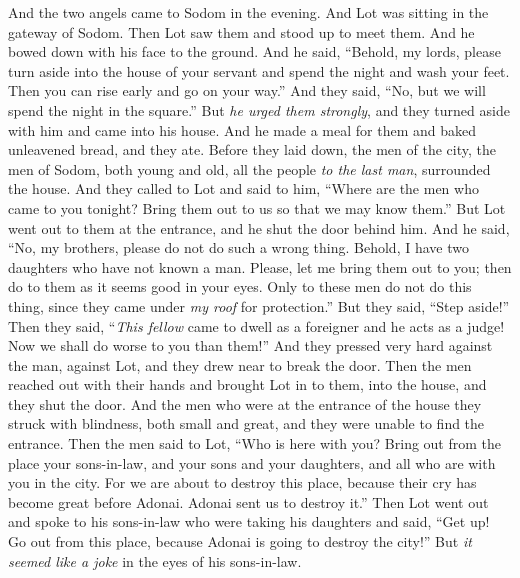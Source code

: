 \begin{biblechapter} %
 And the two angels came to Sodom in the evening. And Lot was sitting in the gateway of Sodom. Then Lot saw them and stood up to meet them. And he bowed down with his face to the ground.
\verse And he said, “Behold, my lords, please turn aside into the house of your servant and spend the night and wash your feet. Then you can rise early and go on your way.” And they said, “No, but we will spend the night in the square.”
\verse But \textit{he urged them strongly}, and they turned aside with him and came into his house. And he made a meal for them and baked unleavened bread, and they ate.
\verse Before they laid down, the men of the city, the men of Sodom, both young and old, all the people \textit{to the last man}, surrounded the house.
\verse And they called to Lot and said to him, “Where are the men who came to you tonight? Bring them out to us so that we may know them.”
\verse But Lot went out to them at the entrance, and he shut the door behind him.
\verse And he said, “No, my brothers, please do not do such a wrong thing.
\verse Behold, I have two daughters who have not known a man. Please, let me bring them out to you; then do to them as it seems good in your eyes. Only to these men do not do this thing, since they came under\textit{ my roof} for protection.”
\verse But they said, “Step aside!” Then they said, “\textit{This fellow} came to dwell as a foreigner and he acts as a judge! Now we shall do worse to you than them!” And they pressed very hard against the man, against Lot, and they drew near to break the door.
\verse Then the men reached out with their hands and brought Lot in to them, into the house, and they shut the door.
\verse And the men who were at the entrance of the house they struck with blindness, both small and great, and they were unable to find the entrance.
\verse Then the men said to Lot, “Who is here with you? Bring out from the place your sons-in-law, and your sons and your daughters, and all who are with you in the city.
\verse For we are about to destroy this place, because their cry has become great before Adonai. Adonai sent us to destroy it.”
\verse Then Lot went out and spoke to his sons-in-law who were taking his daughters and said, “Get up! Go out from this place, because Adonai is going to destroy the city!” But \textit{it seemed like a joke} in the eyes of his sons-in-law.

\end{biblechapter}
